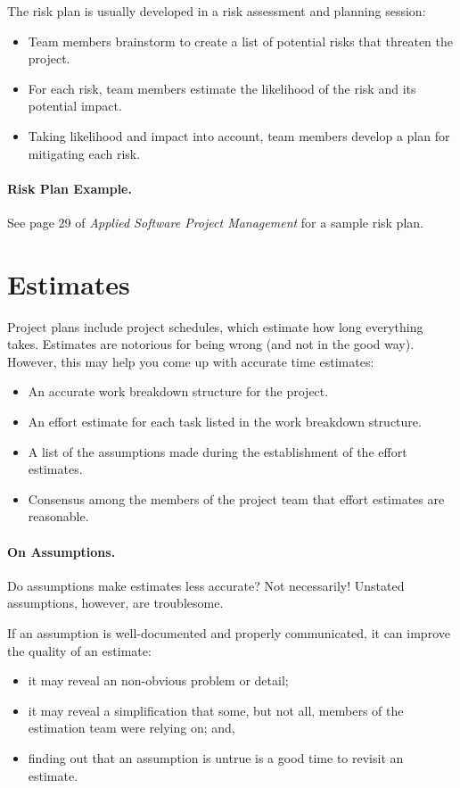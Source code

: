 The risk plan is usually developed in a risk assessment and planning session:
\begin{itemize}
\item Team members brainstorm to create a list of potential risks that threaten the project.
\item For each risk, team members estimate the likelihood of the risk and its potential impact.
\item Taking likelihood and impact into account, team members develop a plan for mitigating each risk.
\end{itemize}

\paragraph{Risk Plan Example.} See page 29 of \emph{Applied Software Project
Management} for a sample risk plan.

\section*{Estimates}
Project plans include project schedules, which estimate how long
everything takes. Estimates are notorious for being wrong (and not in
the good way).  However, this may help you come up with accurate time
estimates:

\begin{itemize}
\item An accurate work breakdown structure for the project.
\item An effort estimate for each task listed in the work breakdown structure.
\item A list of the assumptions made during the establishment of the effort estimates.
\item Consensus among the members of the project team that effort estimates are reasonable.
\end{itemize}

\paragraph{On Assumptions.} Do assumptions make estimates less accurate?
Not necessarily! Unstated assumptions, however, are troublesome.

If an assumption is well-documented and properly communicated, it can
improve the quality of an estimate:
\begin{itemize}
\item it may reveal an non-obvious problem or detail;
\item it may reveal a simplification that some, but not all, members of the estimation team were relying on; and,
\item finding out that an assumption is untrue is a good time to revisit an estimate.
\end{itemize}

